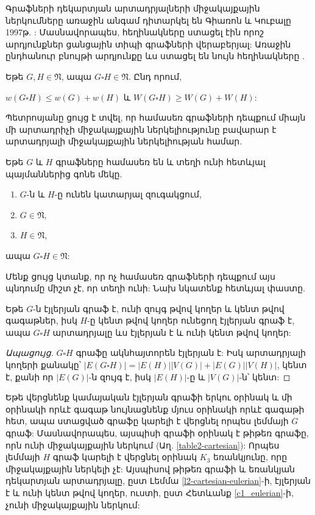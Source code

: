 Գրաֆների դեկարտյան արտադրյալների միջակայքային ներկումները առաջին անգամ դիտարկել են Գիառոն և Կուբալը 1997թ. \cite{GiaroKubale1997}: Մասնավորապես, հեղինակները ստացել էին որոշ արդյունքներ ցանցային տիպի գրաֆների վերաբերյալ: Առաջին ընդհանուր բնույթի արդյունքը ևս ստացել են նույն հեղինակները \cite{GiaroKubale2004,Kubale2004}.

\begin{theorem}
\label{t2_cartesian} Եթե $G,H\in \mathfrak{N}$, ապա $G\square H\in \mathfrak{N}$. Ընդ որում,
\begin{center}
$w(G\square H)\leq w(G)+w(H)$ և $W(G\square H)\geq W(G)+W(H)$:
\end{center}
\end{theorem}

Պետրոսյանը \cite{Petrosyan2011} ցույց է տվել, որ համասեռ գրաֆների դեպքում միայն մի արտադրիչի միջակայքային ներկելիությունը բավարար է արտադրյալի միջակայքային ներկելիության համար.
\begin{theorem}
\label{t2_kotzig} Եթե $G$ և $H$ գրաֆները համասեռ են և տեղի ունի հետևյալ պայմաններից գոնե մեկը.
\begin{enumerate}
\item $G$-ն և $H$-ը ունեն կատարյալ զուգակցում,
\item $G\in \mathfrak{N}$,
\item $H\in \mathfrak{N}$,
\end{enumerate}
ապա $G \square H \in \mathfrak{N}$:
\end{theorem}

Մենք ցույց կտանք, որ ոչ համասեռ գրաֆների դեպքում այս պնդումը միշտ չէ, որ տեղի ունի: Նախ նկատենք հետևյալ փաստը.

\begin{lemma}
\label{l2-cartesian-eulerian}
Եթե $G$-ն էյլերյան գրաֆ է, ունի զույգ թվով կողեր և կենտ թվով գագաթներ, իսկ $H$-ը կենտ թվով կողեր ունեցող էյլերյան գրաֆ է, ապա $G \square H$ արտադրյալը ևս էյլերյան է և ունի կենտ թվով կողեր:
\end{lemma}
\begin{proof}[Ապացույց]
$G\square H$ գրաֆը ակնհայտորեն էյլերյան է: Իսկ արտադրյալի կողերի քանակը՝ $|E(G \square H)| = |E(H)||V(G)| + |E(G)||V(H)|$, կենտ է, քանի որ $|E(G)|$-ն զույգ է, իսկ $|E(H)|$-ը և $|V(G)|$-ն՝ կենտ:
\end{proof}

Եթե վերցնենք կամայական էյլերյան գրաֆի երկու օրինակ և մի օրինակի որևէ գագաթ նույնացնենք մյուս օրինակի որևէ գագաթի հետ, ապա ստացված գրաֆը կարելի է վերցնել որպես լեմմայի $G$ գրաֆ: Մասնավորապես, այսպիսի գրաֆի օրինակ է թիթեռ գրաֆը, որն ունի միջակայքային ներկում (Աղ. \ref{table2-cartesian}): Որպես լեմմայի $H$ գրաֆ կարելի է վերցնել օրինակ $K_3$ եռանկյունը, որը միջակայքային ներկելի չէ: Այսպիսով թիթեռ գրաֆի և եռանկյան դեկարտյան արտադրյալը, ըստ Լեմմա \ref{l2-cartesian-eulerian}-ի, էյլերյան է և ունի կենտ թվով կողեր, ուստի, ըստ Հետևանք \ref{c1_eulerian}-ի, չունի միջակայքային ներկում:

